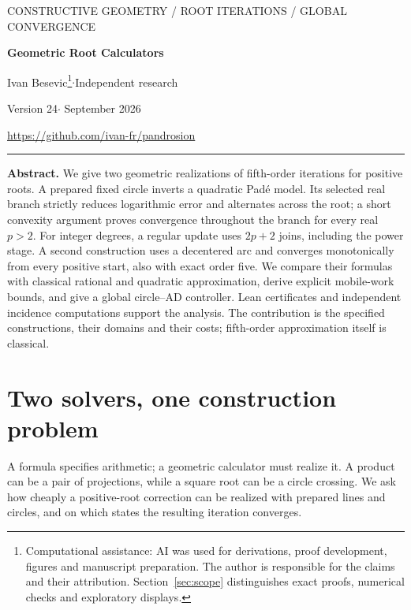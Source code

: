 \documentclass[11pt,a4paper]{article}
\begin{document}
\thispagestyle{empty}
{\small\sffamily\color{accent} CONSTRUCTIVE GEOMETRY / ROOT ITERATIONS / GLOBAL CONVERGENCE}\par
\vspace{8pt}
{\fontsize{24}{27}\selectfont\bfseries\color{ink} Geometric Root Calculators\par}
\vspace{5pt}{\large Two fifth-order solvers and their construction cost}\par
\vspace{9pt}Ivan Besevic\footnote{Computational assistance: AI was used for derivations, proof development, figures and manuscript preparation. The author is responsible for the claims and their attribution. Section~\ref{sec:scope} distinguishes exact proofs, numerical checks and exploratory displays.}\quad$\cdot$\quad Independent research\par
{\small Version 24\quad$\cdot$ September 2026}\par
\url{https://github.com/ivan-fr/pandrosion}
\vspace{8pt}\hrule\vspace{8pt}
\textbf{Abstract.}
We give two geometric realizations of fifth-order iterations for positive roots. A prepared fixed circle inverts a quadratic Pad\'e model. Its selected real branch strictly reduces logarithmic error and alternates across the root; a short convexity argument proves convergence throughout the branch for every real $p>2$. For integer degrees, a regular update uses $2p+2$ joins, including the power stage. A second construction uses a decentered arc and converges monotonically from every positive start, also with exact order five. We compare their formulas with classical rational and quadratic approximation, derive explicit mobile-work bounds, and give a global circle--AD controller. Lean certificates and independent incidence computations support the analysis. The contribution is the specified constructions, their domains and their costs; fifth-order approximation itself is classical.

\section{Two solvers, one construction problem}
A formula specifies arithmetic; a geometric calculator must realize it. A product can be a pair of projections, while a square root can be a circle crossing. We ask how cheaply a positive-root correction can be realized with prepared lines and circles, and on which states the resulting iteration converges.
\end{document}
